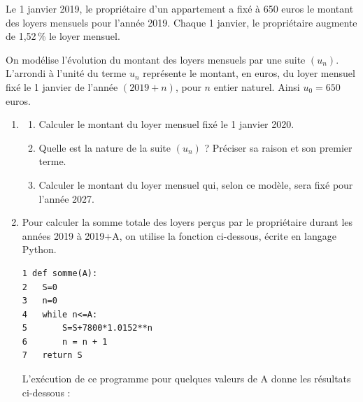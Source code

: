 
\medskip

Le 1 janvier 2019, le propriétaire d'un appartement a fixé à 650 euros le montant des loyers mensuels pour l'année 2019. Chaque 1 janvier, le propriétaire augmente de 1,52\,\% le loyer mensuel.

On modélise l'évolution du montant des loyers mensuels par une suite $\left(u_n\right)$. L'arrondi à l'unité du terme $u_n$ représente le montant, en euros, du loyer mensuel fixé le 1 janvier de l'année $(2019+n)$, pour $n$ entier naturel. Ainsi $u_0 = 650$ euros.

\medskip

\begin{enumerate}
\item 
	\begin{enumerate}
		\item Calculer le montant du loyer mensuel fixé le 1 janvier 2020.
		\item Quelle est la nature de la suite $\left(u_n\right)$ ? Préciser sa raison et son premier terme.
		\item Calculer le montant du loyer mensuel qui, selon ce modèle, sera fixé pour l'année 2027.
	\end{enumerate}
\item Pour calculer la somme totale des loyers perçus par le propriétaire durant les années 2019
à 2019+A, on utilise la fonction ci-dessous, écrite en langage Python.

\begin{lstlisting}[style=python]
1 def somme(A):
2 	S=0
3 	n=0
4 	while n<=A:
5		S=S+7800*1.0152**n
6 		n = n + 1
7 	return S
\end{lstlisting}

L'exécution de ce programme pour quelques valeurs de A donne les résultats ci-dessous :


\end{enumerate}

